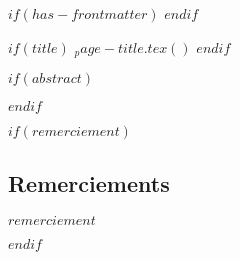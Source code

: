 $if(has-frontmatter)$
\frontmatter
$endif$

$if(title)$
  $_page-title.tex()$
$endif$


$if(abstract)$
  \renewcommand{\abstractname}{\section{Résumé}\label{ruxe9sumuxe9}}
  \begin{abstract}
    \begin{center}
      $abstract$
    \end{center}
    {\newpage}
  \end{abstract}
$endif$

$if(remerciement)$
  \begin{center}
    \section{Remerciements}\label{remerciement}
    $remerciement$
  \end{center}
  {\newpage}
$endif$
